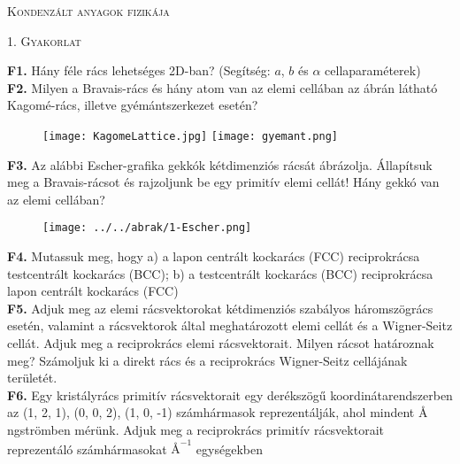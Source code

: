 \documentclass[12pt]{article}
\begin{document}
\centerline{
\textsc{\Large{ Kondenzált anyagok fizikája}}
}
\centerline{ 
\textsc{\large{1. Gyakorlat}}
}
\vspace{10mm}
\textbf{F1.} Hány féle rács lehetséges 2D-ban? (Segítség: $a$, $b$ és $\alpha$  cellaparaméterek)
\\

\textbf{F2.} Milyen a Bravais-rács és hány atom van az elemi cellában az ábrán látható Kagomé-rács, illetve gyémántszerkezet esetén?

\begin{figure}[h!]

\begin{center}


\texttt{[image: KagomeLattice.jpg]} \hspace{10mm}
\texttt{[image: gyemant.png]}
\end{center}
\end{figure}

\textbf{F3.} Az alábbi Escher-grafika gekkók kétdimenziós rácsát ábrázolja. Állapítsuk meg a Bravais-rácsot és rajzoljunk be egy primitív elemi cellát! Hány gekkó van az elemi cellában?
\begin{figure}[h!]
\begin{center}
\texttt{[image: ../../abrak/1-Escher.png]}
\end{center}
\end{figure}

\textbf{F4.} Mutassuk meg, hogy 
a) a lapon centrált kockarács (FCC) reciprokrácsa testcentrált kockarács (BCC);
b) a testcentrált kockarács (BCC) reciprokrácsa lapon centrált kockarács (FCC)
\\

\textbf{F5.} Adjuk  meg  az  elemi  rácsvektorokat kétdimenziós  szabályos háromszögrács esetén,  valamint  a  rácsvektorok  által  meghatározott  elemi  cellát  és  a Wigner-Seitz  cellát.  Adjuk  meg  a reciprokrács elemi rácsvektorait. Milyen rácsot határoznak meg? Számoljuk ki a direkt rács és a reciprokrács Wigner-Seitz cellájának területét.
\\

\textbf{F6.} Egy kristályrács primitív rácsvektorait egy derékszögű koordinátarendszerben az (1, 2, 1), (0, 0, 2), (1, 0, -1) számhármasok reprezentálják, ahol mindent $\si{\angstrom}$ngströmben mérünk. Adjuk meg a reciprokrács primitív rácsvektorait reprezentáló számhármasokat $\si{\angstrom}^{-1}$ egységekben
\end{document}
